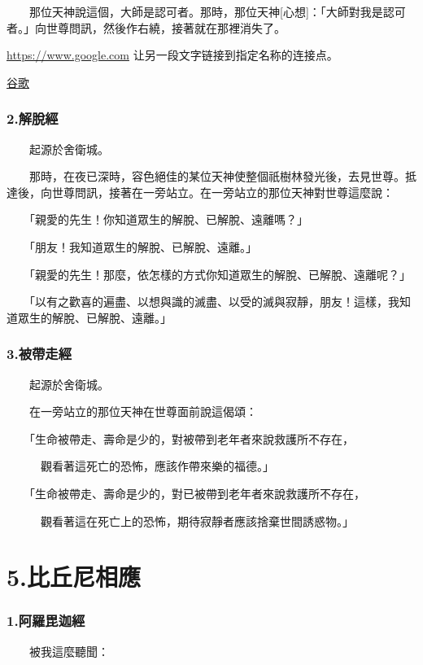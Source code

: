 \documentclass[12pt,oneside]{book}
\begin{document}
　　那位天神說這個，大師是認可者。那時，那位天神[心想]：「大師對我是認可者。」向世尊問訊，然後作右繞，接著就在那裡消失了。

\hyperlink{sn 1.1}{https://www.google.com} 让另一段文字链接到指定名称的连接点。

\href{https://www.google.com}{谷歌}

\subsection{2.解脫經}
　　起源於舍衛城。

　　那時，在夜已深時，容色絕佳的某位天神使整個祇樹林發光後，去見世尊。抵達後，向世尊問訊，接著在一旁站立。在一旁站立的那位天神對世尊這麼說：

　　「親愛的先生！你知道眾生的解脫、已解脫、遠離嗎？」

　　「朋友！我知道眾生的解脫、已解脫、遠離。」

　　「親愛的先生！那麼，依怎樣的方式你知道眾生的解脫、已解脫、遠離呢？」

　　「以有之歡喜的遍盡、以想與識的滅盡、以受的滅與寂靜，朋友！這樣，我知道眾生的解脫、已解脫、遠離。」

\subsection{3.被帶走經}

　　起源於舍衛城。

　　在一旁站立的那位天神在世尊面前說這偈頌：

　　「生命被帶走、壽命是少的，對被帶到老年者來說救護所不存在，

　　　觀看著這死亡的恐怖，應該作帶來樂的福德。」

　　「生命被帶走、壽命是少的，對已被帶到老年者來說救護所不存在，

　　　觀看著這在死亡上的恐怖，期待寂靜者應該捨棄世間誘惑物。」

\chapter{5.比丘尼相應}

\subsection{1.阿羅毘迦經}
\label{subsec:5.1ss}

　　被我這麼聽聞：
\end{document}
